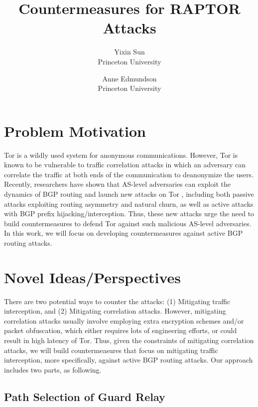 \documentclass{acm_proc_article-sp}
\begin{document}
\date{}

\title{\Large \bf Countermeasures for RAPTOR Attacks}
\author{
 {\rm Yixin Sun}\\
 Princeton University
 \and
 {\rm Anne Edmundson}\\
 Princeton University
} %

\maketitle


\section{Problem Motivation}

Tor is a wildly used system for anonymous communications. However, Tor is known to be vulnerable to traffic correlation attacks in which an adversary can correlate the traffic at both ends of the communication to deanonymize the users. Recently, researchers have shown that AS-level adversaries can exploit the dynamics of BGP routing and launch new attacks on Tor \cite{sun2015raptor}, including both passive attacks exploiting routing asymmetry and natural churn, as well as active attacks with BGP prefix hijacking/interception. Thus, these new attacks urge the need to build countermeasures to defend Tor against such malicious AS-level adversaries. In this work, we will focus on developing countermeasures against active BGP routing attacks. 

\section{Novel Ideas/Perspectives}

There are two potential ways to counter the attacks: (1) Mitigating traffic interception, and (2) Mitigating correlation attacks. However, mitigating correlation attacks usually involve employing extra encryption schemes and/or packet obfuscation, which either requires lots of engineering efforts, or could result in high latency of Tor. Thus, given the constraints of mitigating correlation attacks, we will build countermeasures that focus on mitigating traffic interception, more specifically, against active BGP routing attacks. Our approach includes two parts, as following. 

\subsection{Path Selection of Guard Relay}
\end{document}
